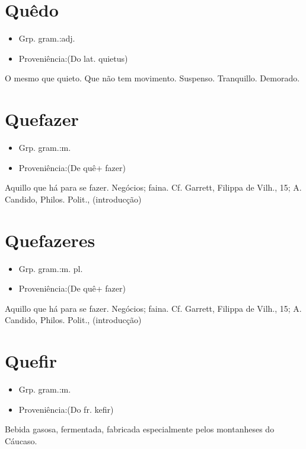 \section{Quêdo}
\begin{itemize}
\item {Grp. gram.:adj.}
\end{itemize}
\begin{itemize}
\item {Proveniência:(Do lat. \textunderscore quietus\textunderscore )}
\end{itemize}
O mesmo que \textunderscore quieto\textunderscore .
Que não tem movimento.
Suspenso.
Tranquillo.
Demorado.
\section{Quefazer}
\begin{itemize}
\item {Grp. gram.:m.}
\end{itemize}
\begin{itemize}
\item {Proveniência:(De \textunderscore quê\textunderscore  + \textunderscore fazer\textunderscore )}
\end{itemize}
Aquillo que há para se fazer.
Negócios; faina. Cf. Garrett, \textunderscore Filippa de Vilh.\textunderscore , 15; A. Candido, \textunderscore Philos. Polit.\textunderscore , (introducção)
\section{Quefazeres}
\begin{itemize}
\item {Grp. gram.:m. pl.}
\end{itemize}
\begin{itemize}
\item {Proveniência:(De \textunderscore quê\textunderscore  + \textunderscore fazer\textunderscore )}
\end{itemize}
Aquillo que há para se fazer.
Negócios; faina. Cf. Garrett, \textunderscore Filippa de Vilh.\textunderscore , 15; A. Candido, \textunderscore Philos. Polit.\textunderscore , (introducção)
\section{Quefir}
\begin{itemize}
\item {Grp. gram.:m.}
\end{itemize}
\begin{itemize}
\item {Proveniência:(Do fr. \textunderscore kefir\textunderscore )}
\end{itemize}
Bebida gasosa, fermentada, fabricada especialmente pelos montanheses do Cáucaso.
